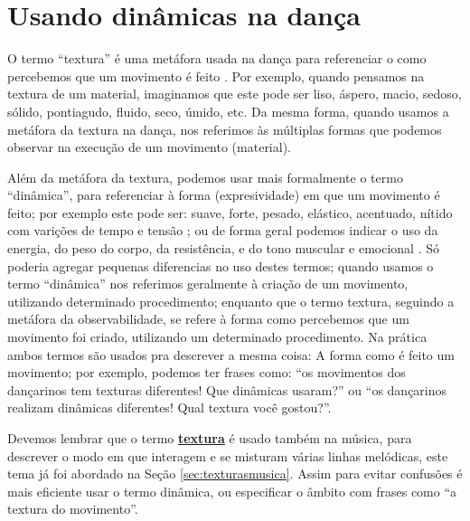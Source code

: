 \newpage
\section{Usando dinâmicas na dança}
\label{sec:musicalidade:dinamicas}

O termo ``textura'' é uma metáfora usada na dança para referenciar 
o como percebemos que um movimento é feito \cite[pp. 127,268,270]{preston1995dance}.
Por exemplo, quando pensamos na textura de um material,
imaginamos que este pode ser liso, áspero, macio, sedoso, sólido, pontiagudo, fluido, seco, úmido, etc. 
Da mesma forma, quando usamos a metáfora  da textura na dança,
nos referimos às múltiplas formas que podemos observar na execução de um movimento (material).

Além da metáfora da textura, podemos usar mais formalmente o termo ``dinâmica'', 
para referenciar à forma (expresividade) em que um movimento é feito;
por exemplo este pode ser: suave, forte, pesado, elástico, acentuado, nítido com varições de tempo e tensão \cite[pp. 268]{preston1995dance}
\cite[pp. 10]{cullingford2013children} \cite[pp. 424, 447]{guest2013labanotation};
ou de forma geral podemos indicar o uso da energia, do peso do corpo, da resistência, e do tono muscular e emocional \cite[pp. 424]{cullingford2013children}.
Só poderia agregar pequenas diferencias no uso destes termos;
quando usamos o termo ``dinâmica'' nos referimos geralmente à criação de um movimento, 
utilizando determinado procedimento;
enquanto que o termo textura, seguindo a metáfora da observabilidade, 
se refere à forma como percebemos que um movimento foi criado, utilizando  um determinado procedimento.
Na prática ambos termos são usados pra descrever a mesma coisa: A forma como é feito um movimento;
por exemplo, podemos ter frases como: ``os movimentos dos dançarinos tem texturas diferentes! Que dinâmicas usaram?''
ou ``os dançarinos realizam dinâmicas diferentes! Qual textura você gostou?''.

\begin{tcbattention}
Devemos lembrar que o termo \hyperref[sec:texturasmusica]{\textbf{textura}} 
é usado também na música, 
para descrever o modo em que interagem e se misturam várias linhas melódicas,
este tema já foi abordado na Seção \ref{sec:texturasmusica}.
Assim para evitar confusões é mais eficiente usar o termo dinâmica,
ou especificar o âmbito com frases como ``a textura do movimento''.
\end{tcbattention}


